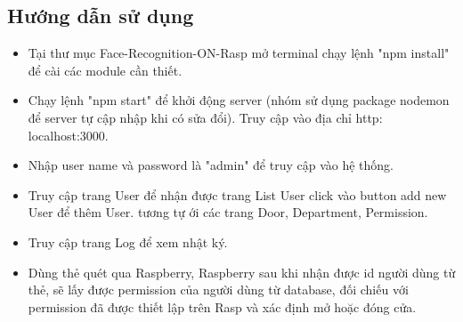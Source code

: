 \documentclass[a4paper]{article}
\begin{document}
\subsection{Hướng dẫn sử dụng}
\hspace{6mm}
\begin{itemize}
    \item Tại thư mục Face-Recognition-ON-Rasp mở terminal chạy lệnh "npm install" để cài các module cần thiết.
    \item Chạy lệnh "npm start" để khởi động server (nhóm sử dụng package nodemon để server tự cập nhập khi có sửa đổi). Truy cập vào địa chỉ http:\\localhost:3000.
    \item Nhập user name và password là "admin" để truy cập vào hệ thống.
    \item Truy cập trang User để nhận được trang List User click vào button add new User để thêm User. tương tự ới các trang Door, Department, Permission.
    \item Truy cập trang Log để xem nhật ký.
    \item Dùng thẻ quét qua Raspberry, Raspberry sau khi nhận được id người dùng từ thẻ, sẽ lấy được permission của người dùng từ database, đối chiếu với permission đã được thiết lập trên Rasp và xác định mở hoặc đóng cửa.
\end{itemize}
\end{document}
